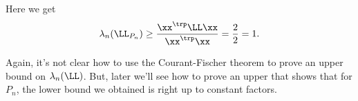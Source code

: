 Here we get
\begin{align*}
\lambda_n(\LL_{P_n}) \geq \frac{ \xx^\trp \LL \xx}{ \xx^\trp \xx} = \frac{2}{2} = 1.
\end{align*}

Again, it's not clear how to use the Courant-Fischer theorem to prove
an upper bound on $\lambda_n(\LL) $.
But, later we'll see how to prove an upper that shows that
for $P_n$, the lower bound we obtained is right up to constant factors.




